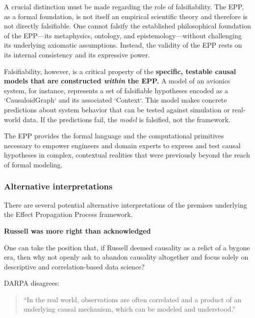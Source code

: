 A crucial distinction must be made regarding the role of falsifiability. The EPP, as a formal foundation, is not itself an empirical scientific theory and therefore is not directly falsifiable. One cannot falsify the established philosophical foundation of the EPP—its metaphysics, ontology, and epistemology—without challenging its underlying axiomatic assumptions. Instead, the validity of the EPP rests on its internal consistency and its expressive power.

Falsifiability, however, is a critical property of the \textbf{specific, testable causal models that are constructed \textit{within} the EPP.} A model of an avionics system, for instance, represents a set of falsifiable hypotheses encoded as a `CausaloidGraph` and its associated `Context`. This model makes concrete predictions about system behavior that can be tested against simulation or real-world data. If the predictions fail, the \textit{model} is falsified, not the framework.

The EPP provides the formal language and the computational primitives necessary to empower engineers and domain experts to express and test causal hypotheses in complex, contextual realities that were previously beyond the reach of formal modeling.

\subsubsection{Alternative interpretations}

There are several potential alternative interpretations of the premises underlying the Effect Propagation Process framework.

\textbf{Russell was more right than acknowledged}

One can take the position that, if Russell deemed causality as a relict of a bygone era, then why not openly ask to abandon causality altogether and focus solely on descriptive and correlation-based data science?

DARPA disagrees\cite{DARPA_ANSR}:

\begin{quote}
    “In the real world, observations are often correlated and a product of an underlying causal mechanism, which can be modeled and understood.”
\end{quote}

